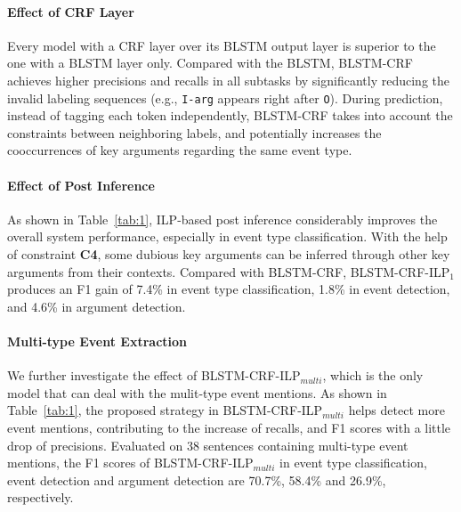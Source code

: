 
\paragraph{Effect of CRF Layer} 
Every model with a CRF layer over its BLSTM output layer is superior to the one with a BLSTM layer only. Compared with the BLSTM, BLSTM-CRF achieves higher precisions and recalls in all subtasks by significantly reducing the invalid labeling sequences (e.g., \texttt{I-arg} appears right after \texttt{O}). During prediction, instead of tagging each token independently, BLSTM-CRF takes into account the constraints between neighboring labels, and potentially increases the cooccurrences of key arguments regarding the same event type. %

\paragraph{Effect of Post Inference} 
As shown in Table~\ref{tab:1}, ILP-based post inference considerably improves the overall system performance, especially in event type classification. With the help of constraint \textbf{C4},  some dubious key arguments can be inferred through other key arguments from their contexts. Compared with BLSTM-CRF, BLSTM-CRF-ILP$_1$ produces an F1 gain of 7.4\% in event type classification, 1.8\% in event detection, and 4.6\% in argument detection. %

\paragraph{Multi-type Event Extraction}
We further investigate the effect of BLSTM-CRF-ILP$_{multi}$, which is the only model that can deal with the mulit-type event mentions. As shown in Table~\ref{tab:1}, the proposed strategy in BLSTM-CRF-ILP$_{multi}$ helps detect more event mentions, contributing to the increase of recalls, and F1 scores with a little drop of precisions. Evaluated on 38 sentences containing multi-type event mentions, the F1 scores of BLSTM-CRF-ILP$_{multi}$ in event type classification, event detection and argument detection are 70.7\%, 58.4\% and 26.9\%, respectively.

